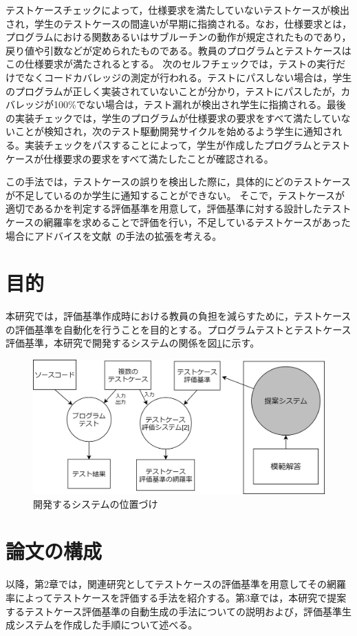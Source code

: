\documentclass{tpu-sotu}
\begin{document}
テストケースチェックによって，仕様要求を満たしていないテストケースが検出され，学生のテストケースの間違いが早期に指摘される。なお，仕様要求とは，プログラムにおける関数あるいはサブルーチンの動作が規定されたものであり，戻り値や引数などが定められたものである。教員のプログラムとテストケースはこの仕様要求が満たされるとする。
次のセルフチェックでは，テストの実行だけでなくコードカバレッジの測定が行われる。テストにパスしない場合は，学生のプログラムが正しく実装されていないことが分かり，テストにパスしたが，カバレッジが100\%でない場合は，テスト漏れが検出され学生に指摘される。最後の実装チェックでは，学生のプログラムが仕様要求の要求をすべて満たしていないことが検知され，次のテスト駆動開発サイクルを始めるよう学生に通知される。実装チェックをパスすることによって，学生が作成したプログラムとテストケースが仕様要求の要求をすべて満たしたことが確認される。

この手法では，テストケースの誤りを検出した際に，具体的にどのテストケースが不足しているのか学生に通知することができない。
そこで，テストケースが適切であるかを判定する評価基準を用意して，評価基準に対する設計したテストケースの網羅率を求めることで評価を行い，不足しているテストケースがあった場合にアドバイスを文献~\cite{a1}の手法の拡張を考える。
\section{目的}
本研究では，評価基準作成時における教員の負担を減らすために，テストケースの評価基準を自動化を行うことを目的とする。プログラムテストとテストケース評価基準，本研究で開発するシステムの関係を図\ref{a3}に示す。

\begin{figure}[h]
  \centering
  \includegraphics[width=130mm]{提案システムの位置づけ2.png}
  \caption{開発するシステムの位置づけ}
  \label{a3}
\end{figure}

\section{論文の構成}
以降，第2章では，関連研究としてテストケースの評価基準を用意してその網羅率によってテストケースを評価する手法を紹介する。第3章では，本研究で提案するテストケース評価基準の自動生成の手法についての説明および，評価基準生成システムを作成した手順について述べる。
\end{document}
